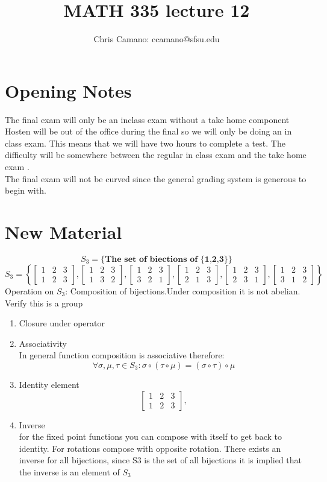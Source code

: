 \documentclass[11pt]{article}
\author{Chris Camano: ccamano@sfsu.edu}
\title{MATH 335  lecture 12 }
\date
\theoremstyle{definition}  %
\begin{document}
\maketitle
\section{Opening Notes}
The final exam will only be an inclass exam without a take home component Hosten will be out of the office during the final so we will only be doing an in class exam. This means that we will have two hours to complete a test. The difficulty will be somewhere between the regular in class exam and the take home exam . \\
The final exam will not be curved since the general grading system is generous to begin with.
\section{New Material}
\[
  S_3=\{\textbf{The set of biections of \{1,2,3}\}\}
\]
$$S_3=\left\{
\begin{bmatrix}
  1&2&3\\
  1&2&3
\end{bmatrix},
\begin{bmatrix}
  1&2&3\\
  1&3&2
\end{bmatrix},
\begin{bmatrix}
  1&2&3\\
  3&2&1
\end{bmatrix},
\begin{bmatrix}
  1&2&3\\
  2&1&3
\end{bmatrix},
\begin{bmatrix}
  1&2&3\\
  2&3&1
\end{bmatrix},
\begin{bmatrix}
  1&2&3\\
  3&1&2
\end{bmatrix}\right\}$$
Operation on $S_3$: Composition of bijections.Under composition it is not abelian.
Verify this is a group
\begin{enumerate}
  \item Closure under operator\\
  \item Associativity\\
  In general function composition is associative therefore:
  \[
    \forall \sigma, \mu, \tau \in S_3: \sigma \circ(\tau \circ \mu)=(\sigma \circ \tau)\circ \mu
  \]
  \item Identity element \\
  \[
  \begin{bmatrix}
    1&2&3\\
    1&2&3
  \end{bmatrix},
  \]
  \item Inverse\\
  for the fixed point functions you can compose with itself to get back to identity. For rotations compose with opposite rotation. There exists an inverse for all bijections, since S3 is the set of all bijections it is implied that the inverse is an element of $S_3$
\end{enumerate}
\end{document}

